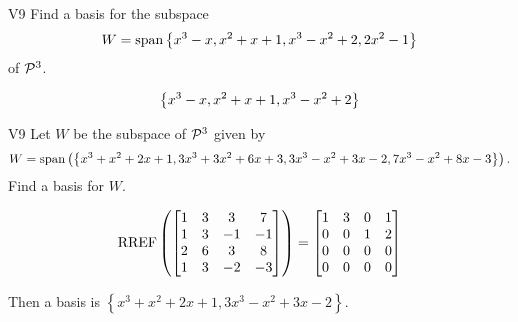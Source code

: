 \begin{problem}{V9}
Find a basis for the subspace 
\[W=\vspan\setList{ x^3-x, x^2+x+1, x^3-x^2+2, 2x^2-1 }\] of \(\P^3\).
\end{problem}
\begin{solution}
\[\setList{ x^3-x, x^2+x+1, x^3-x^2+2}\]
\end{solution}

\begin{problem}{V9}
Let \(W\) be the subspace of \(\P^3\) given by 
\[W = \vspan \left( \left\{ x^3+x^2+2x+1, 3x^3+3x^2+6x+3, 3x^3-x^2+3x-2, 7x^3-x^2+8x-3 \right\} \right).\]  
Find a basis for \(W\).
\end{problem}
\begin{solution}
\[\RREF\left(\begin{bmatrix} 1 & 3 & 3 & 7 \\ 1 & 3 & -1 & -1 \\ 2 & 6 & 3 & 8 \\ 1 & 3 & -2 & -3 \end{bmatrix}\right) = \begin{bmatrix} 1 & 3 & 0 & 1 \\ 0 & 0 & 1 & 2 \\ 0 & 0 & 0 & 0 \\  0 & 0 & 0 & 0 \end{bmatrix}\]

Then a basis is
\( \left\{ x^3+x^2+2x+1, 3x^3-x^2+3x-2 \right\} \).
\end{solution}


